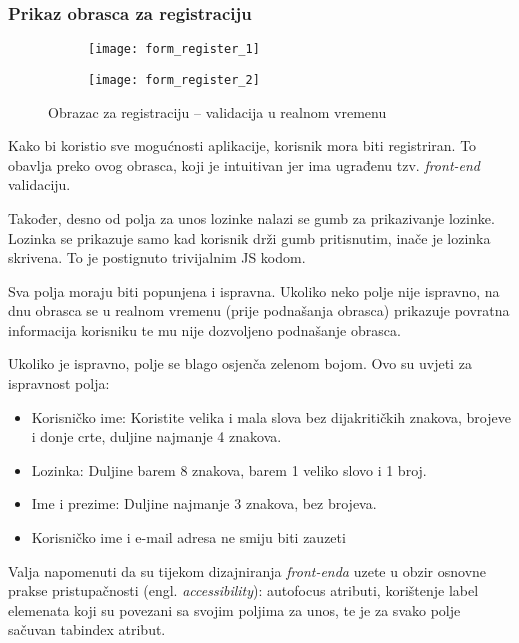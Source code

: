     \subsubsection{Prikaz obrasca za registraciju}

      \begin{figure}[h]
          \begin{subfigure}{0.5\textwidth}
            \texttt{[image: form\_register\_1]}
          \end{subfigure}
          \begin{subfigure}{0.5\textwidth}
            \texttt{[image: form\_register\_2]}
          \end{subfigure}

          \caption{Obrazac za registraciju -- validacija u realnom vremenu}
      \end{figure}

      Kako bi koristio sve mogućnosti aplikacije, korisnik mora biti
      registriran. To obavlja preko ovog obrasca, koji je intuitivan jer ima
      ugrađenu tzv. \textit{front-end} validaciju.

      Također, desno od polja za unos lozinke nalazi se gumb za prikazivanje
      lozinke. Lozinka se prikazuje samo kad korisnik drži gumb pritisnutim,
      inače je lozinka skrivena. To je postignuto trivijalnim JS kodom.

      Sva polja moraju biti popunjena i ispravna. Ukoliko neko polje nije ispravno,
      na dnu obrasca se u realnom vremenu (prije podnašanja obrasca) prikazuje
      povratna informacija korisniku te mu nije dozvoljeno podnašanje
      obrasca.

      Ukoliko je ispravno, polje se blago osjenča zelenom bojom. Ovo su uvjeti za
      ispravnost polja:

      \begin{itemize}
        \item Korisničko ime: Koristite velika i mala slova bez dijakritičkih
        znakova, brojeve i donje crte, duljine najmanje 4 znakova.
        \item Lozinka: Duljine barem 8 znakova, barem 1 veliko slovo i 1 broj.
        \item Ime i prezime: Duljine najmanje 3 znakova, bez brojeva.
        \item Korisničko ime i e-mail adresa ne smiju biti zauzeti
      \end{itemize}

      Valja napomenuti da su tijekom dizajniranja \textit{front-enda} uzete u
      obzir osnovne prakse pristupačnosti (engl. \textit{accessibility}):
      autofocus atributi, korištenje label elemenata koji su povezani sa svojim
      poljima za unos, te je za svako polje sačuvan tabindex atribut.

